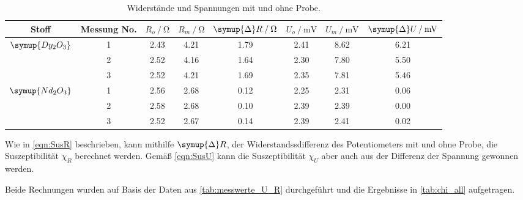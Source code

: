 \begin{table}
  \centering
  \caption{Widerstände und Spannungen mit und ohne Probe.}
  \label{tab:messwerte_U_R}
  \begin{tabular}{c c | S S S | S S S}
  \toprule
  Stoff &
  Messung No. &
  $R_o \mathbin{/} \si{\ohm}$ &
  $R_m \mathbin{/} \si{\ohm}$ &
  $\symup{\Delta}R \mathbin{/} \si{\ohm}$ &
  $U_o \mathbin{/} \si{\milli\volt}$ &
  $U_m \mathbin{/} \si{\milli\volt}$ &
  $\symup{\Delta}U \mathbin{/} \si{\milli\volt}$ \\
  \midrule
  $\symup{Dy_2O_3}$ & 1 & 2.43 & 4.21 & 1.79  &  2.41 & 8.62 & 6.21 \\
                    & 2 & 2.52 & 4.16 & 1.64  &  2.30 & 7.80 & 5.50 \\
                    & 3 & 2.52 & 4.21 & 1.69  &  2.35 & 7.81 & 5.46 \\
  \midrule
  $\symup{Nd_2O_3}$ & 1 & 2.56 & 2.68 & 0.12  &  2.25 & 2.31 & 0.06 \\
                    & 2 & 2.58 & 2.68 & 0.10  &  2.39 & 2.39 & 0.00 \\
                    & 3 & 2.52 & 2.67 & 0.14  &  2.39 & 2.41 & 0.02 \\
  \bottomrule
  \end{tabular}
\end{table}


Wie in \autoref{eqn:SusR} beschrieben,
kann mithilfe $\symup{\Delta}R$,
der Widerstandssdifferenz des Potentiometers mit und ohne Probe,
die Suszeptibilität $\chi_R$ berechnet werden.
Gemäß \autoref{eqn:SusU} kann die Suszeptibilität $\chi_U$ aber auch aus der
Differenz der Spannung gewonnen werden.

Beide Rechnungen wurden auf Basis der Daten aus \autoref{tab:messwerte_U_R} durchgeführt und die Ergebnisse in \autoref{tab:chi_all} aufgetragen.

